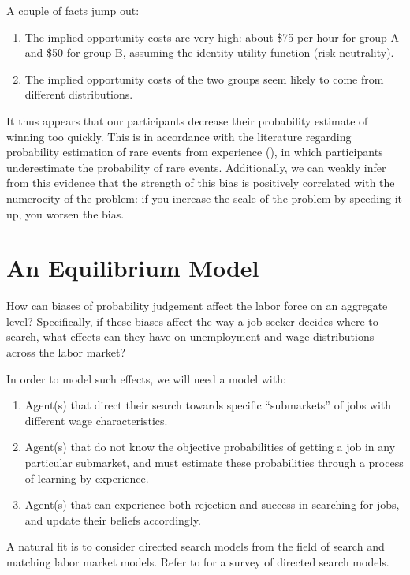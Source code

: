 \documentclass[a4paper,12pt]{article}
\begin{document}
A couple of facts jump out:

\begin{enumerate}
\item The implied opportunity costs are very high: about \$75 per hour for group A and \$50 for group B, assuming the identity utility function (risk neutrality).
\item The implied opportunity costs of the two groups seem likely to come from different distributions.
\end{enumerate}

It thus appears that our participants decrease their probability estimate of winning too quickly. This is in accordance with the literature regarding probability estimation of rare events from experience (\cite{hertwig2004}), in which participants underestimate the probability of rare events. Additionally, we can weakly infer from this evidence that the strength of this bias is positively correlated with the numerocity of the problem: if you increase the scale of the problem by speeding it up, you worsen the bias.


\section{ An Equilibrium Model }

How can biases of probability judgement affect the labor force on an aggregate level? Specifically, if these biases affect the way a job seeker decides where to search, what effects can they have on unemployment and wage distributions across the labor market?

In order to model such effects, we will need a model with:
%
\begin{enumerate}
\item Agent(s) that direct their search towards specific ``submarkets'' of jobs with different wage characteristics.
\item Agent(s) that do not know the objective probabilities of getting a job in any particular submarket, and must estimate these probabilities through a process of learning by experience.
\item Agent(s) that can experience both rejection and success in searching for jobs, and update their beliefs accordingly.
\end{enumerate}
%
A natural fit is to consider directed search models from the field of search and matching labor market models. Refer to \cite{wright2017} for a survey of directed search models.
\end{document}
